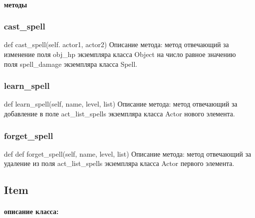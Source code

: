 \paragraph{методы}
\subsubsection{cast\_spell}
def cast\_spell(self. actor1, actor2)
Описание метода: метод отвечающий за изменение поля obj\_hp экземпляра класса Object на число равное значению поля spell\_damage экземпляра класса Spell.
\subsubsection{learn\_spell}
def learn\_spell(self, name, level, list)
Описание метода: метод отвечающий за добавление в поле act\_list\_spells экземпляра класса Actor нового элемента.
\subsubsection{forget\_spell}
def def forget\_spell(self, name, level, list)
Описание метода: метод отвечающий за удаление из поля act\_list\_spells экземпляра класса Actor первого элемента.

\subsection{Item}
\paragraph{описание класса:}
